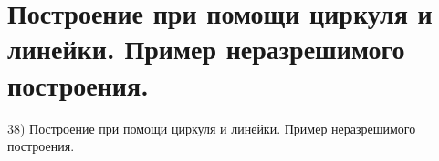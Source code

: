 \section{
 Построение при помощи циркуля и линейки. Пример неразрешимого построения.
}

38) Построение при помощи циркуля и линейки. Пример неразрешимого построения.
